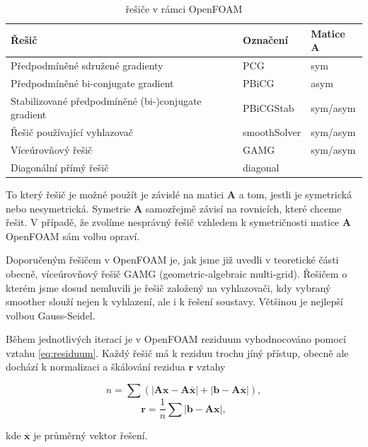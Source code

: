\documentclass[a4paper,12pt]{report}
\theoremstyle{remark}
\begin{document}
\begin{table}[H]
	\centering
	\caption{řešiče v rámci OpenFOAM}
	\renewcommand{\arraystretch}{1.7}
	\begin{tabular}{*3l}
		\toprule
		\textbf{Řešič} & \textbf{Označení}&\textbf{Matice $\boldsymbol{A}$}\\
		\midrule
		{\small Předpodmíněné sdružené gradienty}& PCG& sym\\
		{\small Předpodmíněné bi-conjugate gradient}& PBiCG&asym \\		
		{\small Stabilizované předpodmíněné (bi-)conjugate gradient}& PBiCGStab&sym/asym  \\
		{\small Řešič používající vyhlazovač}& smoothSolver&sym/asym \\
		{\small Víceúrovňový řešič}& GAMG&sym/asym  \\
		{\small Diagonální přímý řešič}& 	diagonal \\
	
		\bottomrule
	\end{tabular}
	
	\label{table:solvers}
\end{table}
		
To který řešič je možné použít je závislé na matici $\boldsymbol{A}$ a tom, jestli je symetrická nebo nesymetrická. Symetrie $\boldsymbol{A}$ samozřejmě závisí na rovnicích, které chceme řešit. V případě, že zvolíme nesprávný řešič vzhledem k symetričnosti matice $\boldsymbol{A}$ OpenFOAM sám volbu opraví.

Doporučeným řešičem v OpenFOAM je, jak jsme již uvedli v teoretické části obecně,  víceúrovňový řešič GAMG (geometric-algebraic multi-grid). Řešičem o kterém jsme dosud nemluvili je řešič založený na vyhlazovači, kdy vybraný smoother slouží nejen k vyhlazení, ale i k řešení soustavy.  Většinou je nejlepší volbou Gauss-Seidel.

Během jednotlivých iterací je v OpenFOAM reziduum vyhodnocováno pomocí vztahu \eqref{eq:residuum}. Každý řešič má k reziduu trochu jíný přístup, obecně ale dochází k normalizaci a škálování rezidua $\boldsymbol{r}$ vztahy

$$n = \sum \left( | \boldsymbol{A} \boldsymbol{x} - \boldsymbol{A} \overline{\boldsymbol{x}} | + | \boldsymbol{b} - \boldsymbol{A} \overline{\boldsymbol{x}} | \right),$$
$$\boldsymbol{r} = \frac{1}{n} \sum | \boldsymbol{b} - \boldsymbol{A} \boldsymbol{x} |,$$

kde $\overline{\boldsymbol{x}}$ je průměrný vektor řešení.  
\end{document}
